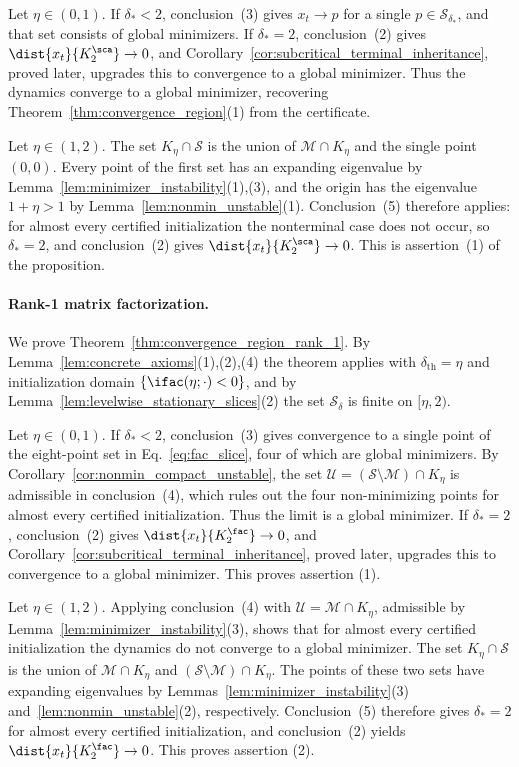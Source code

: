 \documentclass{article}
\begin{document}
Let $\eta\in(0,1)$. If $\delta_\ast<2$, conclusion~(3) gives $x_t\to p$ for a
single $p\in\mathcal S_{\delta_\ast}$, and that set
consists of global minimizers. If $\delta_\ast=2$, conclusion~(2) gives
$\dist{x_t}{K_2^\sca}\to0$, and
Corollary~\ref{cor:subcritical_terminal_inheritance}, proved later, upgrades
this to convergence to a global minimizer. Thus the dynamics converge to a
global minimizer, recovering Theorem~\ref{thm:convergence_region}(1) from the
certificate.

Let $\eta\in(1,2)$. The set $K_\eta\cap\mathcal S$ is the union of
$\mathcal M\cap K_\eta$ and the single point $(0,0)$. Every point of the
first set has an expanding eigenvalue by
Lemma~\ref{lem:minimizer_instability}(1),(3), and the origin has the
eigenvalue $1+\eta>1$ by Lemma~\ref{lem:nonmin_unstable}(1). Conclusion~(5)
therefore applies: for almost every certified initialization the nonterminal
case does not occur, so $\delta_\ast=2$, and conclusion~(2) gives
$\dist{x_t}{K_2^\sca}\to0$. This is assertion~(1) of the proposition.

\paragraph{Rank-1 matrix factorization.}
We prove Theorem~\ref{thm:convergence_region_rank_1}. By
Lemma~\ref{lem:concrete_axioms}(1),(2),(4) the theorem applies with
$\delta_{\mathrm{th}}=\eta$ and initialization domain
$\{\ifac(\eta;\cdot)<0\}$, and by
Lemma~\ref{lem:levelwise_stationary_slices}(2) the set $\mathcal S_\delta$ is
finite on $[\eta,2)$.

Let $\eta\in(0,1)$. If $\delta_\ast<2$, conclusion~(3) gives convergence to a
single point of the eight-point set in Eq.~\eqref{eq:fac_slice}, four of which
are global minimizers. By Corollary~\ref{cor:nonmin_compact_unstable}, the set
$\mathcal U=(\mathcal S\setminus\mathcal M)\cap K_\eta$ is admissible in
conclusion~(4), which rules out the four non-minimizing points for almost every
certified initialization. Thus the limit is a global minimizer. If
$\delta_\ast=2$, conclusion~(2) gives
$\dist{x_t}{K_2^\fac}\to0$, and
Corollary~\ref{cor:subcritical_terminal_inheritance}, proved later, upgrades
this to convergence to a global minimizer. This proves assertion (1).

Let $\eta\in(1,2)$. Applying conclusion~(4) with
$\mathcal U=\mathcal M\cap K_\eta$, admissible by
Lemma~\ref{lem:minimizer_instability}(3), shows that for almost every
certified initialization the dynamics do not converge to a global minimizer.
The set $K_\eta\cap\mathcal S$ is the union of $\mathcal M\cap K_\eta$ and
$(\mathcal S\setminus\mathcal M)\cap K_\eta$. The points of these two sets have
expanding eigenvalues by Lemmas~\ref{lem:minimizer_instability}(3)
and~\ref{lem:nonmin_unstable}(2), respectively. Conclusion~(5) therefore gives
$\delta_\ast=2$ for almost every certified initialization, and conclusion~(2)
yields $\dist{x_t}{K_2^\fac}\to0$. This proves assertion (2).
\end{document}
